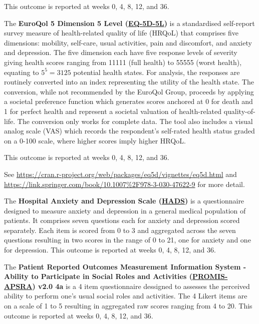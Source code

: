 \documentclass[
]{article}
\begin{document}
This outcome is reported at weeks 0, 4, 8, 12, and 36.

\label{outcome:eq5d5l}
The \textbf{EuroQol 5 Dimension 5 Level (\hyperref[analysis:eq5d5l]{EQ-5D-5L})} is a standardised self-report survey measure of health-related quality of life (HRQoL) that comprises five dimensions: mobility, self-care, usual activities, pain and discomfort, and anxiety and depression.
The five dimension each have five response levels of severity giving health scores ranging from 11111 (full health) to 55555 (worst health), equating to $5^5 = 3125$ potential health states.
For analysis, the responses are routinely converted into an index representing the utility of the health state.
The conversion, while not recommended by the EuroQol Group, proceeds by applying a societal preference function which generates scores anchored at 0 for death and 1 for perfect health and represent a societal valuation of health-related quality-of-life.
The conversion only works for complete data.
The tool also includes a visual analog scale (VAS) which records the respondent's self-rated health status graded on a 0-100 scale, where higher scores imply higher HRQoL.

This outcome is reported at weeks 0, 4, 8, 12, and 36.

See \url{https://cran.r-project.org/web/packages/eq5d/vignettes/eq5d.html} and \url{https://link.springer.com/book/10.1007\%2F978-3-030-47622-9} for more detail.

\label{outcome:hads}
The \textbf{Hospital Anxiety and Depression Scale (\hyperref[analysis:hads]{HADS})} \cite{zigmond1983hospital} is a questionnaire designed to measure anxiety and depression in a general medical population of patients.
It comprises seven questions each for anxiety and depression scored separately.
Each item is scored from 0 to 3 and aggregated across the seven questions resulting in two scores in the range of 0 to 21, one for anxiety and one for depression.
This outcome is reported at weeks 0, 4, 8, 12, and 36.

\label{outcome:promis-apsra}
The \textbf{Patient Reported Outcomes Measurement Information System - Ability to Participate in Social Roles and Activities (\hyperref[analysis:promis-aspra]{PROMIS-APSRA}) v2.0 4a} \cite{cella2019promis} is a 4 item questionnaire dessigned to assesses the perceived ability to perform one’s usual social roles and activities.
The 4 Likert items are on a scale of 1 to 5 resulting in aggregated raw scores ranging from 4 to 20.
This outcome is reported at weeks 0, 4, 8, 12, and 36.
\end{document}
